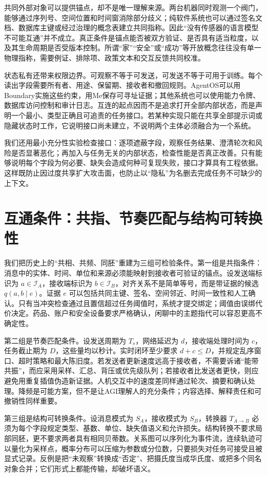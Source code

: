 共同外部对象可以提供锚点，却不是唯一理解来源。两台机器同时观测一个阀门，能够通过序列号、空间位置和时间窗消除部分歧义；纯软件系统也可以通过签名文档、数据库主键或经过治理的概念表建立共同指称。因此“没有传感器的语言模型不可能互通”并不成立。真正条件是锚点能否被双方验证、是否具有适当粒度，以及其生命周期是否受版本控制。所谓“家”“安全”或“成功”等开放概念往往没有单一物理指称，需要例证、排除项、政策文本和交互反馈共同校准。

状态私有还带来权限边界。可观察不等于可发送，可发送不等于可用于训练。每个读出字段需要所有者、用途、保留期、接收者和撤回规则。AgentOS可以用Boundary实施这些约束，用Me保存可寻址证据；其他系统也可以使用能力令牌、数据库访问控制和审计日志。互连的起点因而不是追求打开全部内部状态，而是声明一个最小、类型正确且可追责的任务接口。若某种实现只能在共享全部提示词或隐藏状态时工作，它说明接口尚未建立，不说明两个主体必须融合为一个系统。

我们还用最小充分性实验检查接口：逐项遮蔽字段，观察任务结果、澄清轮次和风险是否显著恶化；再加入与任务无关的内部状态，检查性能是否真正改善。只有能够说明每个字段为何必要、缺失会造成何种可复现失败，接口才算具有工程依据。这样既防止因过度共享扩大攻击面，也防止以“隐私”为名删去完成任务不可缺少的上下文。

\section{互通条件：共指、节奏匹配与结构可转换性}
\label{sec:three_axioms_interconnect}

我们把历史上的“共相、共频、同胚”重建为三组可检验条件。第一组是共指条件：消息中的实体、时间、单位和来源必须能映射到接收者可验证的锚点。设发送端标识为 $a\in\mathcal I_A$，接收端标识为 $b\in\mathcal I_B$，对齐关系不是简单等号，而是带证据的候选 $q(a,b\mid e)$。证据 $e$ 可以包括共同主键、签名、空间邻近、时间一致性和人工确认。只有当冲突检查通过且置信超过任务阈值时，系统才提交绑定；阈值由误绑代价决定。药品、账户和安全设备要求严格确认，闲聊中的主题指代可以容忍更高不确定性。

第二组是节奏匹配条件。设发送周期为 $T_s$，网络延迟为 $d$，接收端处理时间为 $c$，任务截止期为 $D$，这些量均以秒计。实时闭环至少要求 $d+c\leq D$，并规定乱序窗口、超时策略和最大陈旧度。若发送者更新速度远高于接收者，不需要诉诸“能带共振”，而应采用采样、汇总、背压或优先级队列；若接收者比发送者更快，则应避免用重复插值伪造新证据。人机交互中的速度差同样通过轮次、摘要和确认处理。降频是可能方案，但不是让AGI理解人的充分条件；内容选择、解释责任和可撤销性同样重要。

第三组是结构可转换条件。设消息模式为 $S_A$，接收模式为 $S_B$，转换器 $T_{A\to B}$ 必须为每个字段规定类型、基数、单位、缺失值语义和允许损失。结构转换不要求局部同胚，更不要求两者具有相同贝蒂数。关系图可以序列化为事件流，连续轨迹可以量化为采样点，概率分布可以压缩为参数或分位数，只要损失对任务可接受且被显式记录。反例是把“未观察”转换成“否定”、把摄氏度当成华氏度、或把多个同名对象合并；它们形式上都能传输，却破坏语义。

